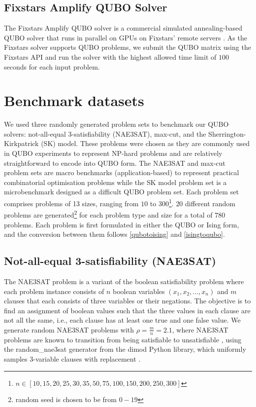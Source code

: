 \subsection{Fixstars Amplify QUBO Solver}
The Fixstars Amplify QUBO solver is a commercial simulated annealing-based QUBO solver that runs in parallel on GPUs on Fixstars' remote servers \cite{fixstarsamplify}. As the Fixstars solver supports QUBO problems, we submit the QUBO matrix using the Fixstars API and run the solver with the highest allowed time limit of $100$ seconds for each input problem.

\section{Benchmark datasets}
We used three randomly generated problem sets to benchmark our QUBO solvers: not-all-equal 3-satisfiability (NAE3SAT), max-cut, and the Sherrington-Kirkpatrick (SK) model. These problems were chosen as they are commonly used in QUBO experiments to represent NP-hard problems and are relatively straightforward to encode into QUBO form. The NAE3SAT and max-cut problem sets are macro benchmarks (application-based) to represent practical combinatorial optimisation problems while the SK model problem set is a microbenchmark designed as a difficult QUBO problem set. Each problem set comprises problems of 13 sizes, ranging from $10$ to $300$\footnote{$n \in [10,15,20,25,30,35,50,75,100,150,200,250,300]$}. $20$ different random problems are generated\footnote{random seed is chosen to be from $0-19$} for each problem type and size for a total of $780$ problems. Each problem is first formulated in either the QUBO or Ising form, and the conversion between them follows \autoref{qubotoising} and \autoref{isingtoqubo}.

\subsection*{Not-all-equal 3-satisfiability (NAE3SAT)}
The NAE3SAT problem is a variant of the boolean satisfiability problem where each problem instance consists of $n$ boolean variables $(x_1, x_2, ..., x_n)$ and $m$ clauses that each consists of three variables or their negations. The objective is to find an assignment of boolean values such that the three values in each clause are not all the same, i.e., each clause has at least one true and one false value. We generate random NAE3SAT problems with $\rho = \frac{m}{n} = 2.1$, where NAE3SAT problems are known to transition from being satisfiable to unsatisfiable \cite{nae3sattransition}, using the random\_nae3sat generator from the dimod Python library, which uniformly samples 3-variable clauses with replacement \cite{dimodrandomnae3sat}. 

